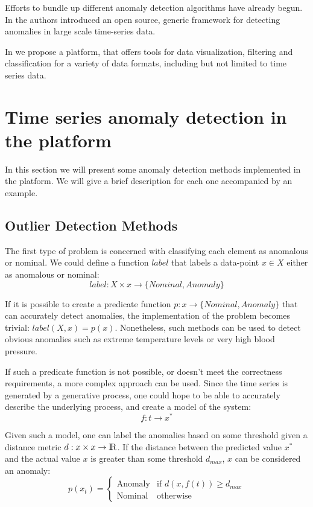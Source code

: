\documentclass[a4paper, 10pt]{article}
\begin{document}
Efforts to bundle up different anomaly detection algorithms have already begun. In \cite{egads2015} the authors introduced an open source, generic framework for detecting anomalies in large scale time-series data.

In \cite{tpad2018} we propose a platform, that offers tools for data visualization, filtering and classification for a variety of data formats, including but not limited to time series data.

\section{Time series anomaly detection in the platform \label{methods}}

In this section we will present some anomaly detection methods implemented in the platform. We will give a brief description for each one accompanied by an example.

\subsection{Outlier Detection Methods}

The first type of problem is concerned with classifying each element as anomalous or nominal. We could define a function $label$ that labels a data-point $x \in X$ either as anomalous or nominal:
$$
    label: X \times x \rightarrow \{Nominal, Anomaly\}
$$

If it is possible to create a predicate function $p: x \rightarrow \{Nominal, Anomaly\}$ that can accurately detect anomalies, the implementation of the problem becomes trivial: $label(X, x) = p(x)$. Nonetheless, such methods can be used to detect obvious anomalies such as extreme temperature levels or very high blood pressure.

If such a predicate function is not possible, or doesn't meet the correctness requirements, a more complex approach can be used. Since the time series is generated by a generative process, one could hope to be able to accurately describe the underlying process, and create a model of the system:
$$
    f: t \rightarrow x^*
$$

Given such a model, one can label the anomalies based on some threshold given a distance metric $d: x \times x \rightarrow {\rm I\!R}$. If the distance between the predicted value $x^*$ and the actual value $x$ is greater than some threshold $d_{max}$, $x$ can be considered an anomaly:
$$
    p(x_t) =
        \begin{cases}
            \text{Anomaly} & \text{if } d(x, f(t)) \ge d_{max} \\
            \text{Nominal} & \text{otherwise}
        \end{cases}
$$
\end{document}
